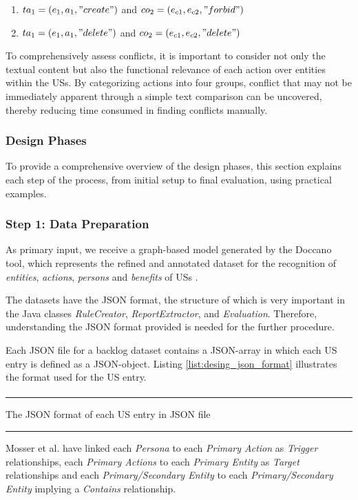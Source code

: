 \begin{definition}
\begin{enumerate}
\begin{enumerate}
			\item $ta_1 = (e_1,a_1,"create")$ and $co_2 = (e_{c1},e_{c2},"forbid")$
			
			\item $ta_1 = (e_1,a_1,"delete")$ and $co_2 = (e_{c1},e_{c2},"delete")$
		\end{enumerate}
	\end{enumerate}
	 
	To comprehensively assess conflicts, it is important to consider not only the textual content but also the functional relevance of each action over entities within the USs. By categorizing actions into four groups, conflict that may not be immediately apparent through a simple text comparison can be uncovered, thereby reducing time consumed in finding conflicts manually.
\end{definition}	


\subsubsection*{Design Phases}\label{design_phases}
To provide a comprehensive overview of the design phases, this section explains each step of the process, from initial setup to final evaluation, using practical examples.
\subsubsection*{Step 1: Data Preparation}\label{design_step_1}
As primary input, we receive a graph-based model generated by the Doccano tool, which represents the refined and annotated dataset for the recognition of \emph{entities}, \emph{actions}, \emph{persons} and \emph{benefits} of USs \cite{arulmohan2023extracting}.

The datasets have the JSON format, the structure of which is very important in the Java classes \textit{RuleCreator}, \textit{ReportExtractor}, and \textit{Evaluation}. Therefore, understanding the JSON format provided is needed for the further procedure.

Each JSON file for a backlog dataset contains a JSON-array in which each US entry is defined as a JSON-object. Listing \ref{list:desing_json_format} illustrates the format used for the US entry.
\begin{MyListing}
	\paragraph{}
	\hrule
	\centering
	
	\caption{The JSON format of each US entry in JSON file}\label{list:desing_json_format}
	\hrule
\end{MyListing}
Mosser et al. have linked each \emph{Persona} to each \emph{Primary Action} as \emph{Trigger} relationships, each \emph{Primary Actions} to each \emph{Primary Entity} as \emph{Target} relationships and each \emph{Primary/Secondary Entity} to each \emph{Primary/Secondary Entity} implying a \emph{Contains} relationship\cite{arulmohan2023extracting}.

